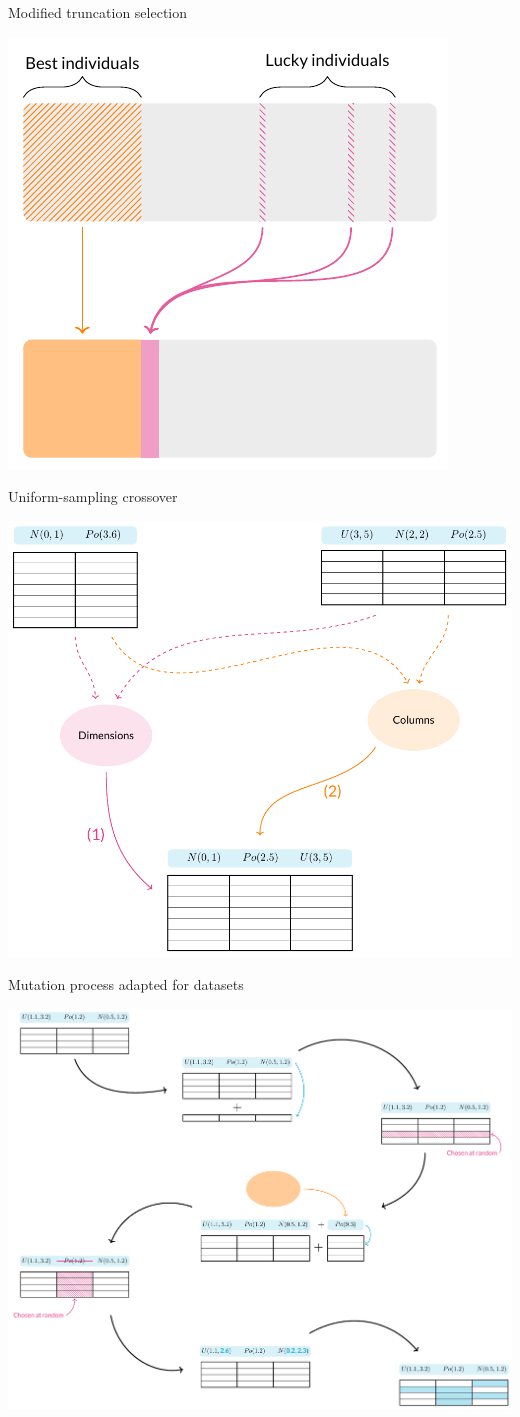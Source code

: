 \documentclass[a0paper]{betterposter}
\begin{document}
{Modified truncation selection

\vspace{.75ex}\begin{center}
    \includegraphics[width=.65\linewidth]{tex/selection.pdf}
\end{center}

Uniform-sampling crossover

\vspace{.75ex}\begin{center}
    \includegraphics[width=.8\linewidth]{tex/crossover.pdf}
\end{center}

Mutation process adapted for datasets

\vspace{.75ex}\begin{center}
    \includegraphics[width=.9\linewidth]{tex/mutation.pdf}
\end{center}
}
\end{document}
